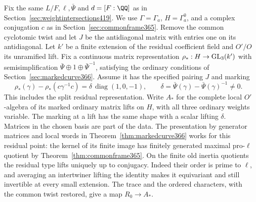 \documentclass[a4paper,11pt]{article}
\theoremstyle{definition}
\theoremstyle{remark}
\numberwithin{equation}{section}
\begin{document}
Fix the same \(L/F,\ell,\bar\Psi\) and \(d=[F:\QQ]\) as in
Section~\ref{sec:weightintersections419}. We use
\(\Gamma=\Gamma_a\), \(H=\Gamma_a^0\), and a complex conjugation
\(c\) as in Section~\ref{sec:commonframe365}. Remove the common
cyclotomic twist and let \(J\) be the antidiagonal matrix with
entries one on its antidiagonal. Let \(k'\) be a finite extension
of the residual coefficient field and \(O'/O\) its unramified
lift. Fix a continuous matrix representation
\(\rho_*:H\to {\rm GL}_3(k')\) with semisimplification
\(\bar\Psi\oplus1\oplus\bar\Psi^{-1}\), satisfying the ordinary
conditions of Section~\ref{sec:markedcurve366}. Assume it has
the specified pairing \(J\) and marking
\[
 \rho_*(\gamma)-\rho_*(c\gamma^{-1}c)
       =\delta\,\operatorname{diag}(1,0,-1),\qquad
 \delta=\bar\Psi(\gamma)-\bar\Psi(\gamma)^{-1}\ne0 .
\]
This includes the split residual representation. Write \(A_*\)
for the complete local \(O'\)-algebra of its marked ordinary
matrix lifts on \(H\), with all three ordinary weights variable.
The marking at a lift has the same shape with a scalar lifting
\(\delta\). Matrices in the chosen basis are part of the data.
The presentation by generator matrices and local words in
Theorem~\ref{thm:markedcurve366} works for this residual point:
the kernel of its finite image has finitely generated maximal
pro-\(\ell\) quotient by Theorem~\ref{thm:commonframe365}.
On the finite old inertia quotients the residual type lifts
uniquely up to conjugacy. Indeed their order is prime to
\(\ell\), and averaging an intertwiner lifting the identity
makes it equivariant and still invertible at every small
extension. The trace and the ordered characters, with the
common twist restored, give a map \(R_0\to A_*\).
\end{document}
